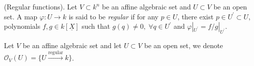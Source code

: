 \begin{dang}
    \begin{definition}
    (Regular functions). Let $V\subset k^n$ be an affine algebraic set and $U\subset V$ be an open set. 
    A map $\varphi:U\to k$ is said to be \textit{regular} if for any $p\in U$, there exist $p\in U^\prime\subset U$, 
    polynomials $f,g\in k[\underline{X}]$ such that $g(q)\neq0,\;\forall q\in U^\prime$ and  
    $\varphi|_{U^\prime}=f/g|_{U^\prime}$.    
    \end{definition}
\end{dang}

\begin{dang}
    \begin{notation}
    Let $V$ be an affine algebraic set and let $U\subset V$ be an open set, we denote 
    $\mathcal{O}_V(U)=\{U\overset{\text{regular}}{\rightarrow}k\}$.
\end{notation}
\end{dang}


